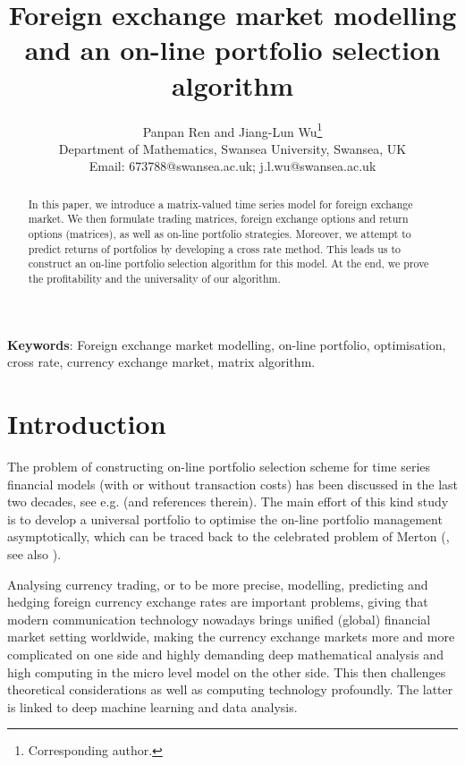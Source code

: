 \documentclass[11pt]{article}
\numberwithin{equation}{section}
\begin{document}
\title{ Foreign exchange market modelling and an on-line portfolio selection algorithm}

\author{Panpan Ren and Jiang-Lun Wu\footnote{Corresponding author.} \\[0.2cm] 
{\small Department of Mathematics, Swansea University, Swansea, UK}\\
{\small  Email: 673788@swansea.ac.uk; j.l.wu@swansea.ac.uk }}
\maketitle

\begin{abstract}
In this paper, we introduce a matrix-valued time series model for foreign exchange market. We then formulate trading matrices, foreign exchange 
options and return options (matrices), as well as on-line portfolio strategies. Moreover, we attempt to predict returns of portfolios by developing 
a cross rate method. This leads us to construct an on-line portfolio selection algorithm for this model. At the end, we prove the profitability and 
the universality of our algorithm. 
\end{abstract}


\noindent \textbf{Keywords}: Foreign exchange market modelling, on-line portfolio, optimisation, cross rate, currency exchange market, 
matrix algorithm. 


\section{Introduction}

The problem of constructing on-line portfolio selection scheme for time series financial models (with or without transaction costs) has been discussed in 
the last two decades, see e.g. \cite{Cover,Duffie,CoverOrd,cox0,ALZ2001} (and references therein).  The main effort of this kind study is to develop a universal 
portfolio to optimise the on-line portfolio management asymptotically, which can be traced back to the celebrated problem of Merton (\cite{Merton}, see 
also \cite{Davis,ShreveSoner}).    

Analysing currency trading, or to be more precise, modelling, predicting and hedging foreign currency exchange rates are important problems, giving that 
modern communication technology nowadays brings unified (global) financial market setting worldwide, making the currency exchange markets more and 
more complicated on one side and highly demanding deep mathematical analysis and high computing in the micro level model on the other side. This then 
challenges theoretical considerations as well as computing technology profoundly. The latter is linked to deep machine learning and data analysis. 
\end{document}
